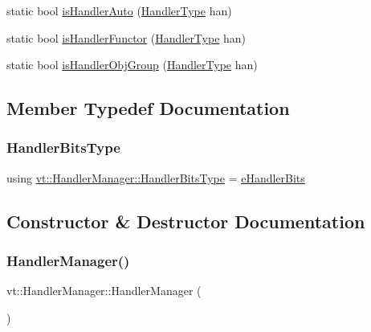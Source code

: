 \begin{DoxyCompactItemize}
\item 
static bool \hyperlink{structvt_1_1_handler_manager_a3324aeb71747bdd6b99194674dc03434}{is\+Handler\+Auto} (\hyperlink{namespacevt_af64846b57dfcaf104da3ef6967917573}{Handler\+Type} han)
\item 
static bool \hyperlink{structvt_1_1_handler_manager_a0d03f576b15390773522317a4086e725}{is\+Handler\+Functor} (\hyperlink{namespacevt_af64846b57dfcaf104da3ef6967917573}{Handler\+Type} han)
\item 
static bool \hyperlink{structvt_1_1_handler_manager_a41bb9a71156fa3010988e8b576022bf5}{is\+Handler\+Obj\+Group} (\hyperlink{namespacevt_af64846b57dfcaf104da3ef6967917573}{Handler\+Type} han)
\end{DoxyCompactItemize}


\subsection{Member Typedef Documentation}
\mbox{\label{structvt_1_1_handler_manager_ac2c93e168ab703b2441e0c38aa28a08f}} 
\subsubsection{\texorpdfstring{Handler\+Bits\+Type}{HandlerBitsType}}
{\footnotesize\ttfamily using \hyperlink{namespacevt_af182285b57b225b163d5d8aff03cb8c2}{vt\+::\+Handler\+Manager\+::\+Handler\+Bits\+Type} =  \hyperlink{namespacevt_af182285b57b225b163d5d8aff03cb8c2}{e\+Handler\+Bits}}



\subsection{Constructor \& Destructor Documentation}
\mbox{\label{structvt_1_1_handler_manager_ab14c2718685b0ecd93d39b129c597ec9}} 
\subsubsection{\texorpdfstring{Handler\+Manager()}{HandlerManager()}}
{\footnotesize\ttfamily vt\+::\+Handler\+Manager\+::\+Handler\+Manager (\begin{DoxyParamCaption}{ }\end{DoxyParamCaption})\hspace{0.3cm}{\ttfamily [default]}}



